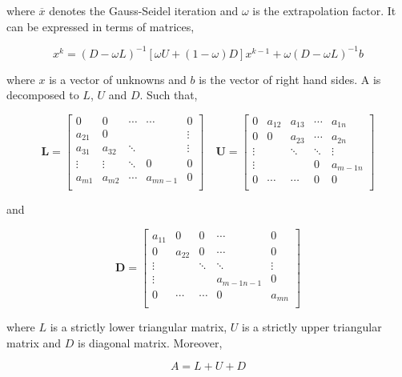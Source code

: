 \noindent where $\overline{x}$ denotes the Gauss-Seidel iteration and $\omega$ is the extrapolation factor. It can be expressed in terms of matrices,

\[
x^k = (D-\omega L)^{-1}[\omega U  + (1-\omega)D]x^{k-1}+\omega(D-\omega L)^{-1} b
\]

\noindent where $x$ is a vector of unknowns and $b$ is the vector of right hand sides. A is decomposed to $L$, $U$ and $D$. Such that,



\[
\mathbf{L} = \left[
\begin{array}{ccccc}
0       & 0     & \cdots &   \cdots  & 0 \\
a_{21}  & 0      &        &          &\vdots \\
a_{31}  & a_{32} & \ddots &          &  \vdots \\
\vdots & \vdots & \ddots &  0       & 0 \\
a_{m1}  & a_{m2} & \cdots  & a_{mn-1} &  0 \\
\end{array}
\right]
\quad
\mathbf{U} = \left[
\begin{array}{ccccc}
0       & a_{12} & a_{13} &  \cdots  & a_{1n} \\
0       & 0      & a_{23}  & \cdots  & a_{2n} \\
\vdots  &        & \ddots &  \ddots &  \vdots \\
\vdots  &        &        &  0      & a_{m-1n} \\
0       & \cdots & \cdots  & 0      &  0 \\
\end{array}
\right]
\]

and

\[
\mathbf{D} = \left[
\begin{array}{ccccc}
a_{11}       & 0      & 0       &  \cdots & 0 \\
0       & a_{22}      & 0  & \cdots  & 0 \\
\vdots  &        & \ddots &  \ddots &  \vdots \\
\vdots  &        &        &  a_{m-1n-1}      & 0 \\
0       & \cdots & \cdots  & 0      &  a_{mn} \\
\end{array}
\right]
\]

where $L$ is a strictly lower triangular matrix, $U$ is a strictly
upper triangular matrix and $D$ is diagonal matrix. Moreover,

\[
A = L+ U +D
\]

